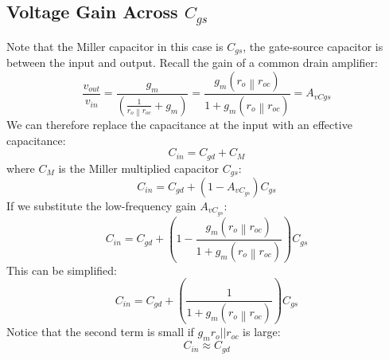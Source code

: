 \subsection{Voltage Gain Across $C_{gs}$}
Note that the Miller capacitor in this case is $C_{gs}$, the gate-source capacitor is between the input and output.  Recall the gain of a common drain amplifier:
\begin{equation}
	\frac{{{v_{out}}}}{{{v_{in}}}} = \frac{{{g_m}}}{{\left( {\frac{1}{{\left. {{r_o}} \right\|{r_{oc}}}} + {g_m}} \right)}} = \frac{{{g_m}(\left. {{r_o}} \right\|{r_{oc}})}}{{1 + {g_m}(\left. {{r_o}} \right\|{r_{oc}})}} = {A_{vCgs}}
\end{equation}
We can therefore replace the capacitance at the input with an effective capacitance:
\begin{equation} 
	{C_{in}} = {C_{gd}} + {C_M} 
\end{equation}
where $C_M$ is the Miller multiplied capacitor $C_{gs}$:
\begin{equation} 
	{C_{in}} = {C_{gd}} + (1 - {A_{v{C_{gs}}}}){C_{gs}} 
\end{equation}
If we substitute the low-frequency gain $A_{v{C_{gs}}}$:
\begin{equation} 
	{C_{in}} = {C_{gd}} + \left(1 - \frac{{{g_m}(\left. {{r_o}} \right\|{r_{oc}})}}{{1 + {g_m}(\left. {{r_o}} \right\|{r_{oc}})}} \right){C_{gs}}
\end{equation}
This can be simplified:
\begin{equation} 
	{C_{in}} = {C_{gd}} + \left(\frac{1}{{1 + {g_m}(\left. {{r_o}} \right\|{r_{oc}})}} \right){C_{gs}} 
\end{equation}
Notice that the second term is small if $g_m r_o || r_{oc}$ is large:
\begin{equation} 
	{C_{in}} \approx {C_{gd}} 
\end{equation}
